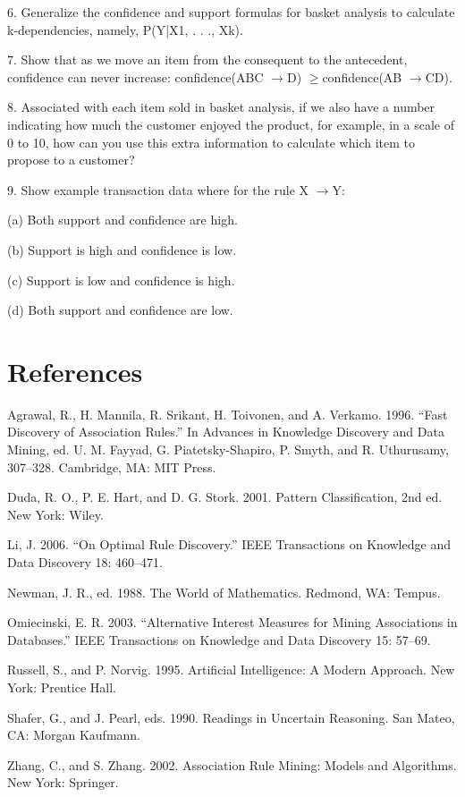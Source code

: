 6. Generalize the confidence and support formulas for basket analysis to calculate k-dependencies, namely, P(Y|X1, . . ., Xk).

7. Show that as we move an item from the consequent to the antecedent, confidence can never increase: confidence(ABC $\to$D) $\geq$confidence(AB $\to$CD).

8. Associated with each item sold in basket analysis, if we also have a number indicating how much the customer enjoyed the product, for example, in a scale of 0 to 10, how can you use this extra information to calculate which item to propose to a customer?

9. Show example transaction data where for the rule X $\to$Y:

(a) Both support and confidence are high.

(b) Support is high and confidence is low.

(c) Support is low and confidence is high.

(d) Both support and confidence are low.

\section{References}

Agrawal, R., H. Mannila, R. Srikant, H. Toivonen, and A. Verkamo. 1996. “Fast Discovery of Association Rules.” In Advances in Knowledge Discovery and Data Mining, ed. U. M. Fayyad, G. Piatetsky-Shapiro, P. Smyth, and R. Uthurusamy, 307--328. Cambridge, MA: MIT Press.

Duda, R. O., P. E. Hart, and D. G. Stork. 2001. Pattern Classification, 2nd ed. New York: Wiley.

Li, J. 2006. “On Optimal Rule Discovery.” IEEE Transactions on Knowledge and Data Discovery 18: 460--471.

Newman, J. R., ed. 1988. The World of Mathematics. Redmond, WA: Tempus.

Omiecinski, E. R. 2003. “Alternative Interest Measures for Mining Associations in Databases.” IEEE Transactions on Knowledge and Data Discovery 15: 57--69.

Russell, S., and P. Norvig. 1995. Artificial Intelligence: A Modern Approach. New York: Prentice Hall.

Shafer, G., and J. Pearl, eds. 1990. Readings in Uncertain Reasoning. San Mateo, CA: Morgan Kaufmann.

Zhang, C., and S. Zhang. 2002. Association Rule Mining: Models and Algorithms. New York: Springer.
